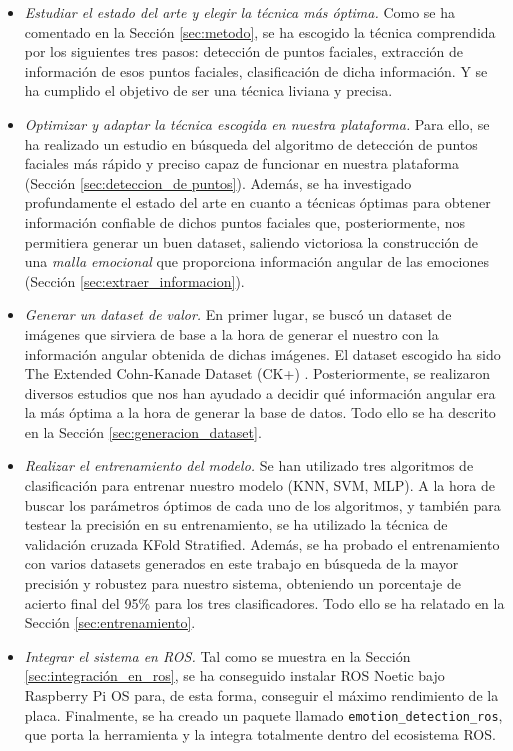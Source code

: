 \begin{itemize}
    \item \textit{Estudiar el estado del arte y elegir la técnica más óptima.} Como se ha comentado en la Sección \ref{sec:metodo}, se ha escogido la técnica comprendida por los siguientes tres pasos: detección de puntos faciales, extracción de información de esos puntos faciales, clasificación de dicha información. Y se ha cumplido el objetivo de ser una técnica liviana y precisa.
    
    \item \textit{Optimizar y adaptar la técnica escogida en nuestra plataforma.} Para ello, se ha realizado un estudio en búsqueda del algoritmo de detección de puntos faciales más rápido y preciso capaz de funcionar en nuestra plataforma (Sección \ref{sec:deteccion_de puntos}). Además, se ha investigado profundamente el estado del arte en cuanto a técnicas óptimas para obtener información confiable de dichos puntos faciales que, posteriormente, nos permitiera generar un buen dataset, saliendo victoriosa la construcción de una \textit{malla emocional} \cite{mediapipe_emotions} que proporciona información angular de las emociones (Sección \ref{sec:extraer_informacion}).
    
    \item \textit{Generar un dataset de valor.} En primer lugar, se buscó un dataset de imágenes que sirviera de base a la hora de generar el nuestro con la información angular obtenida de dichas imágenes. El dataset escogido ha sido The Extended Cohn-Kanade Dataset (CK+) \cite{Kanade1}\cite{Kanade2}. Posteriormente, se realizaron diversos estudios que nos han ayudado a decidir qué información angular era la más óptima a la hora de generar la base de datos. Todo ello se ha descrito en la Sección \ref{sec:generacion_dataset}.
    
    \item \textit{Realizar el entrenamiento del modelo.} Se han utilizado tres algoritmos de clasificación para entrenar nuestro modelo (KNN, SVM, MLP). A la hora de buscar los parámetros óptimos de cada uno de los algoritmos, y también para testear la precisión en su entrenamiento, se ha utilizado la técnica de validación cruzada KFold Stratified. Además, se ha probado el entrenamiento con varios datasets generados en este trabajo en búsqueda de la mayor precisión y robustez para nuestro sistema, obteniendo un porcentaje de acierto final del 95\% para los tres clasificadores. Todo ello se ha relatado en la Sección \ref{sec:entrenamiento}.
    
    \item \textit{Integrar el sistema en ROS.} Tal como se muestra en la Sección \ref{sec:integración_en_ros}, se ha conseguido instalar ROS Noetic bajo Raspberry Pi OS para, de esta forma, conseguir el máximo rendimiento de la placa. Finalmente, se ha creado un paquete llamado \verb|emotion_detection_ros|, que porta la herramienta y la integra totalmente dentro del ecosistema ROS.
\end{itemize}


